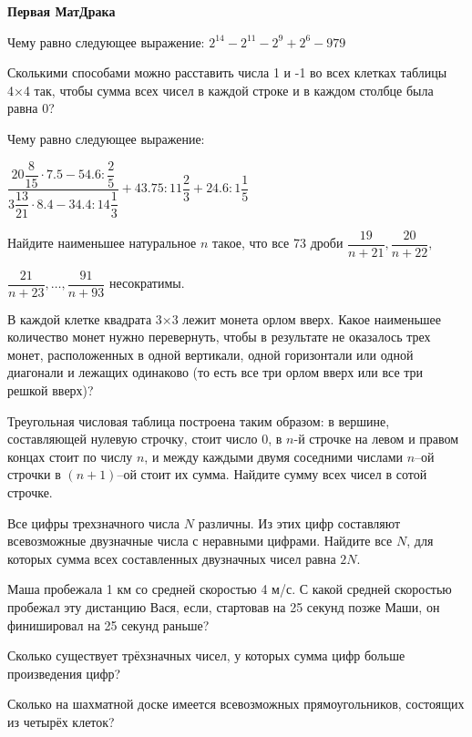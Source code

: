 \centerline{\bf \Huge Первая МатДрака }

 Чему равно следующее выражение:  $2^{14}-2^{11}-2^{9}+2^{6}-979$


 Сколькими способами можно расставить числа 1 и -1 во всех клетках таблицы 4×4 так, чтобы сумма всех чисел в каждой строке и в каждом столбце была равна 0?


 Чему равно следующее выражение:  

$\dfrac{20\dfrac{8}{15}\cdot7.5-54.6:\dfrac{2}{5}}{3\dfrac{13}{21}\cdot8.4-34.4:14\dfrac{1}{3}}+43.75:11\dfrac{2}{3}+24.6:1\dfrac{1}{5}$


Найдите наименьшее натуральное $n$ такое, что все 73 дроби $\dfrac{19}{n+21}, \dfrac{20}{n+22},$ 

$\dfrac{21}{n+23}, …, \dfrac{91}{n+93}$ несократимы.


 В каждой клетке квадрата 3×3 лежит монета орлом вверх. Какое наименьшее количество монет нужно перевернуть, чтобы в результате не оказалось трех монет, расположенных в одной вертикали, одной горизонтали или одной диагонали и лежащих одинаково (то есть все три орлом вверх или все три решкой вверх)?


Треугольная числовая таблица построена таким образом: в вершине, составляющей нулевую строчку, стоит число 0, в $n$-й строчке на левом и правом концах стоит по числу $n$, и между каждыми двумя соседними числами $n$–ой строчки в $(n+1)$–ой стоит их сумма. Найдите сумму всех чисел в сотой строчке.


Все цифры трехзначного числа $N$ различны. Из этих цифр составляют всевозможные двузначные числа с неравными цифрами. Найдите все $N$, для которых сумма всех составленных двузначных чисел равна $2N$.


Маша пробежала 1 км со средней скоростью 4 м/с. С какой средней скоростью пробежал эту дистанцию Вася, если, стартовав на 25 секунд позже Маши, он финишировал на 25 секунд раньше?


 Сколько существует трёхзначных чисел, у которых сумма цифр больше произведения цифр?


 Сколько на шахматной доске имеется всевозможных прямоугольников, состоящих из четырёх клеток?

\begin{flushright}
        \scriptsize{}
\end{flushright}

